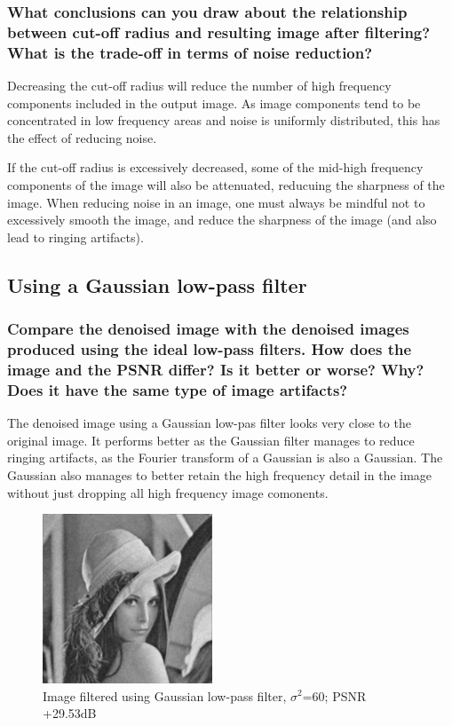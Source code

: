 \documentclass[article, 1.5space, letterpaper, 12pt, oneside, header, footer]{SydeClass}
\begin{document}
\subsubsection{What conclusions can you draw about the relationship between cut-off radius and resulting image
after filtering? What is the trade-off in terms of noise reduction?}

Decreasing the cut-off radius will reduce the number of high frequency components included in the output image. As image components tend to be concentrated in low frequency areas and noise is uniformly distributed, this has the effect of reducing noise.

If the cut-off radius is excessively decreased, some of the mid-high frequency components of the image will also be attenuated, reducuing the sharpness of the image. When reducing noise in an image, one must always be mindful not to excessively smooth the image, and reduce the sharpness of the image (and also lead to ringing artifacts).

\clearpage
\subsection{Using a Gaussian low-pass filter}

\subsubsection{Compare the denoised image with the denoised images produced using the ideal low-pass filters. How does the image and the PSNR differ? Is it better or worse? Why? Does it have the same type of image artifacts?}

The denoised image using a Gaussian low-pas filter looks very close to the original image. It performs better as the Gaussian filter manages to reduce ringing artifacts, as the Fourier transform of a Gaussian is also a Gaussian. The Gaussian also manages to better retain the high frequency detail in the image without just dropping all high frequency image comonents.


\begin{figure}[ht]
\centering
	\includegraphics[width=0.45\textwidth]{question5/4_lena_LFP_gauss60}
	\caption{Image filtered using Gaussian low-pass filter, $\sigma^2$=60; PSNR +29.53dB}
\end{figure}
\end{document}
